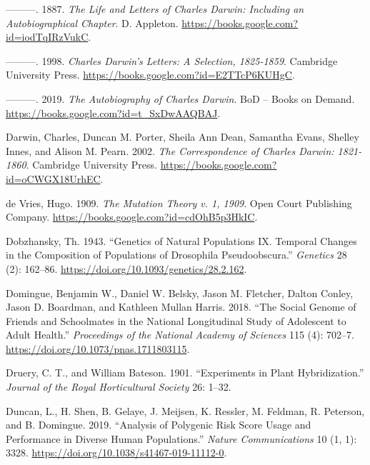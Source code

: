 \documentclass[
]{book}
\newlength{\cslhangindent}
\newlength{\cslentryspacingunit} %
\newenvironment{CSLReferences}[2] %
 {%
  \setlength{\parindent}{0pt}
  \ifodd #1
  \let\oldpar\par
  \def\par{\hangindent=\cslhangindent\oldpar}
  \fi
  \setlength{\parskip}{#2\cslentryspacingunit}
 }%
 {}
\begin{document}
\begin{CSLReferences}{1}{0}
\leavevmode{}%
---------. 1887. \emph{The {Life} and {Letters} of {Charles Darwin}: {Including} an {Autobiographical Chapter}}. {D. Appleton}. \url{https://books.google.com?id=iodTqIRzVukC}.

\leavevmode{}%
---------. 1998. \emph{Charles {Darwin}'s {Letters}: {A Selection}, 1825-1859}. {Cambridge University Press}. \url{https://books.google.com?id=E2TTcP6KUHgC}.

\leavevmode{}%
---------. 2019. \emph{The {Autobiography} of {Charles Darwin}}. {BoD -- Books on Demand}. \url{https://books.google.com?id=t_SxDwAAQBAJ}.

\leavevmode{}%
Darwin, Charles, Duncan M. Porter, Sheila Ann Dean, Samantha Evans, Shelley Innes, and Alison M. Pearn. 2002. \emph{The {Correspondence} of {Charles Darwin}: 1821-1860}. {Cambridge University Press}. \url{https://books.google.com?id=oCWGX18UrhEC}.

\leavevmode{}%
de Vries, Hugo. 1909. \emph{The {Mutation} Theory v. 1, 1909}. {Open Court Publishing Company}. \url{https://books.google.com?id=cdOhB5p3HkIC}.

\leavevmode{}%
Dobzhansky, Th. 1943. {``Genetics of Natural Populations {IX}. {Temporal} Changes in the Composition of Populations of Drosophila Pseudoobscura.''} \emph{Genetics} 28 (2): 162--86. \url{https://doi.org/10.1093/genetics/28.2.162}.

\leavevmode{}%
Domingue, Benjamin W., Daniel W. Belsky, Jason M. Fletcher, Dalton Conley, Jason D. Boardman, and Kathleen Mullan Harris. 2018. {``The Social Genome of Friends and Schoolmates in the {National Longitudinal Study} of {Adolescent} to {Adult Health}.''} \emph{Proceedings of the National Academy of Sciences} 115 (4): 702--7. \url{https://doi.org/10.1073/pnas.1711803115}.

\leavevmode{}%
Druery, C. T., and William Bateson. 1901. {``Experiments in Plant Hybridization.''} \emph{Journal of the Royal Horticultural Society} 26: 1--32.

\leavevmode{}%
Duncan, L., H. Shen, B. Gelaye, J. Meijsen, K. Ressler, M. Feldman, R. Peterson, and B. Domingue. 2019. {``Analysis of Polygenic Risk Score Usage and Performance in Diverse Human Populations.''} \emph{Nature Communications} 10 (1, 1): 3328. \url{https://doi.org/10.1038/s41467-019-11112-0}.


\end{CSLReferences}
\end{document}
